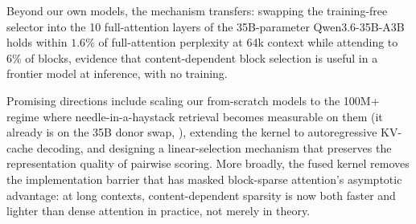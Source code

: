 \documentclass[10pt,letterpaper]{article}
\begin{document}
Beyond our own models, the mechanism transfers: swapping the training-free selector
into the 10 full-attention layers of the 35B-parameter Qwen3.6-35B-A3B holds within
$1.6\%$ of full-attention perplexity at 64k context while attending to $6\%$ of
blocks, evidence that content-dependent block selection is useful in a frontier
model at inference, with no training.

Promising directions include scaling our from-scratch models to the 100M+ regime
where needle-in-a-haystack retrieval becomes measurable on them (it already is on
the 35B donor swap, ), extending the kernel to
autoregressive KV-cache decoding, and designing a linear-selection mechanism
that preserves the representation quality of pairwise scoring. More broadly,
the fused kernel removes the implementation barrier that has masked
block-sparse attention's asymptotic advantage: at long contexts,
content-dependent sparsity is now both faster and lighter than dense
attention in practice, not merely in theory.
\end{document}
